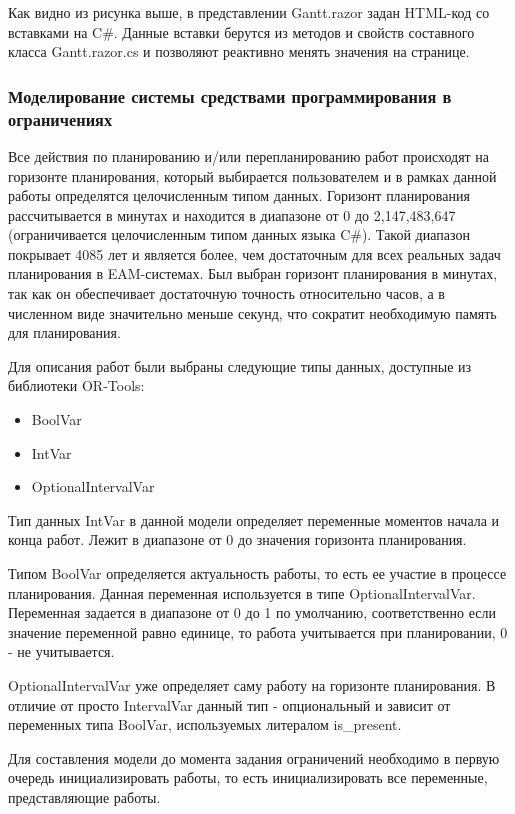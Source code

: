 
Как видно из рисунка выше, в представлении Gantt.razor задан HTML-код со вставками на C\#. Данные вставки берутся из методов и свойств составного класса Gantt.razor.cs и позволяют реактивно менять значения на странице.

\subsubsection{Моделирование системы средствами программирования в ограничениях}

Все действия по планированию и/или перепланированию работ происходят на горизонте планирования, который выбирается пользователем и в рамках данной работы определятся целочисленным типом данных. Горизонт планирования рассчитывается в минутах и находится в диапазоне от 0 до 2,147,483,647 (ограничивается целочисленным типом данных языка C\#). Такой диапазон покрывает 4085 лет и является более, чем достаточным для всех реальных задач планирования в EAM-системах. Был выбран горизонт планирования в минутах, так как он обеспечивает достаточную точность относительно часов, а в численном виде значительно меньше секунд, что сократит необходимую память для планирования.

Для описания работ были выбраны следующие типы данных, доступные из библиотеки OR-Tools:
\begin{itemize}
	\item BoolVar
	\item IntVar
	\item OptionalIntervalVar
\end{itemize}

Тип данных IntVar в данной модели определяет переменные моментов начала и конца работ. Лежит в диапазоне от 0 до значения горизонта планирования.

Типом BoolVar определяется актуальность работы, то есть ее участие в процессе планирования. Данная переменная используется в типе OptionalIntervalVar. Переменная задается в диапазоне от 0 до 1 по умолчанию, соответственно если значение переменной равно единице, то работа учитывается при планировании, 0 - не учитывается.

OptionalIntervalVar уже определяет саму работу на горизонте планирования. В отличие от просто IntervalVar данный тип - опциональный и зависит от переменных типа BoolVar, используемых литералом is\_present.

Для составления модели до момента задания ограничений необходимо в первую очередь инициализировать работы, то есть инициализировать все переменные, представляющие работы.

